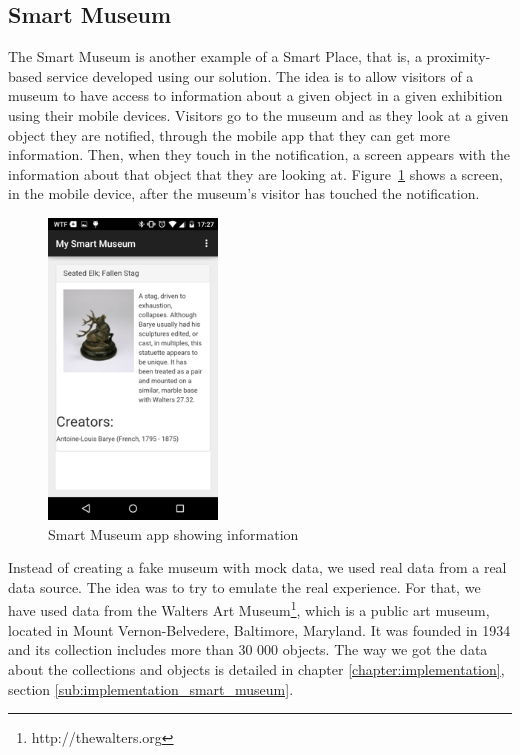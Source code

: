 \subsection{Smart Museum}
\label{sub:smart_museum}
The Smart Museum is another example of a Smart Place, that is, a proximity-based service developed using our solution.
The idea is to allow visitors of a museum to have access to information about a given object in a given exhibition using their mobile devices.
Visitors go to the museum and as they look at a given object they are notified, through the mobile app that they can get more information.
Then, when they touch in the notification, a screen appears with the information about that object that they are looking at.
Figure~\ref{fig:smart_museum_app} shows a screen, in the mobile device, after the museum's visitor has touched the notification.

\begin{figure}[!ht]
  \centering
    \includegraphics[width=0.4\textwidth, keepaspectratio]{images/screenshots/smart_museum_app}
    \caption[Smart Museum]{Smart Museum app showing information}
    \label{fig:smart_museum_app}
\end{figure}

Instead of creating a fake museum with mock data, we used real data from a real data source.
The idea was to try to emulate the real experience.
For that, we have used data from the Walters Art Museum\footnote{http://thewalters.org}, which is a public art museum, located in Mount Vernon-Belvedere, Baltimore, Maryland.
It was founded in 1934 and its collection includes more than 30 000 objects.
The way we got the data about the collections and objects is detailed in chapter \ref{chapter:implementation}, section \ref{sub:implementation_smart_museum}.

